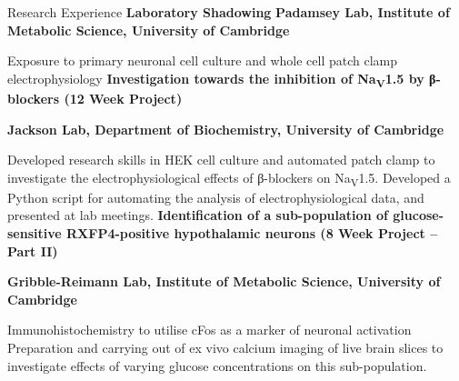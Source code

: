\begin{rubric}{Research Experience}
\entry*[01.2025 - 02.2025]%
	\textbf{Laboratory Shadowing} 
    \textbf{Padamsey Lab, Institute of Metabolic Science, University of Cambridge}\par
	Exposure to primary neuronal cell culture and whole cell patch clamp electrophysiology
%
\entry*[06.2025 - 10.2025]%
	\textbf{Investigation towards the inhibition of Na\textsubscript{V}1.5 by β-blockers (12 Week Project) }\par
    \textbf{Jackson Lab, Department of Biochemistry, University of Cambridge} \par
	Developed research skills in HEK cell culture and automated patch clamp to investigate the electrophysiological effects of β-blockers on Na\textsubscript{V}1.5.
    Developed a Python script for automating the analysis of electrophysiological data, and presented at lab meetings.
%
\entry*[01.2026 - 03.2026\hphantom{l}]%
	\textbf{Identification of a sub-population of glucose-sensitive RXFP4-positive hypothalamic neurons (8 Week Project – Part II) }\par
    \textbf{Gribble-Reimann Lab, Institute of Metabolic Science, University of Cambridge}\par
    Immunohistochemistry to utilise cFos as a marker of neuronal activation
    Preparation and carrying out of ex vivo calcium imaging of live brain slices to investigate effects of varying glucose concentrations on this sub-population.    
%
\end{rubric}
